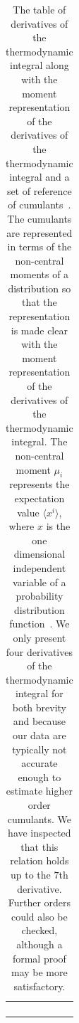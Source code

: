 \begin{table}
\begin{tabularx}{1.0\textwidth}{c |c | c | c}
 & & & \\
 & & & \\
 & & & \\
 & & & \\
\hline\hline
\end{tabularx}
\caption{The table of derivatives of the thermodynamic integral along with the moment representation of the derivatives of the thermodynamic integral and a set of reference of cumulants~\cite{kardar2007statistical}. The cumulants are represented in terms of the non-central moments of a distribution so that the representation is made clear with the moment representation of the derivatives of the thermodynamic integral. The non-central moment $\mu_i$ represents the expectation value $\langle x^i\rangle$, where $x$ is the one dimensional independent variable of a probability distribution function~\cite{abramowitz1965handbook}. We only present four derivatives of the thermodynamic integral for both brevity and because our data are typically not accurate enough to estimate higher order cumulants. We have inspected that this relation holds up to the $7$th derivative. Further orders could also be checked, although a formal proof may be more satisfactory.} \label{table:cumulants}
\end{table}

